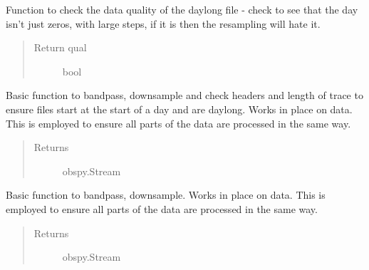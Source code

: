 \documentclass[a4paper,10pt,english]{sphinxmanual}
\begin{document}
\begin{fulllineitems}
\label{modules:pre_processing._check_daylong}
Function to check the data quality of the daylong file - check to see that
the day isn't just zeros, with large steps, if it is then the resampling will
hate it.
\begin{quote}\begin{description}
\item[{Return qual}] \leavevmode
bool

\end{description}\end{quote}

\end{fulllineitems}


\begin{fulllineitems}
\label{modules:pre_processing.dayproc}
Basic function to bandpass, downsample and check headers and length of trace
to ensure files start at the start of a day and are daylong.  Works in place
on data.  This is employed to ensure all parts of the data are processed
in the same way.
\begin{quote}\begin{description}
\item[{Returns}] \leavevmode
obspy.Stream

\end{description}\end{quote}

\end{fulllineitems}


\begin{fulllineitems}
\label{modules:pre_processing.shortproc}
Basic function to bandpass, downsample.  Works in place
on data.  This is employed to ensure all parts of the data are processed
in the same way.
\begin{quote}\begin{description}
\item[{Returns}] \leavevmode
obspy.Stream

\end{description}\end{quote}

\end{fulllineitems}
\end{document}
